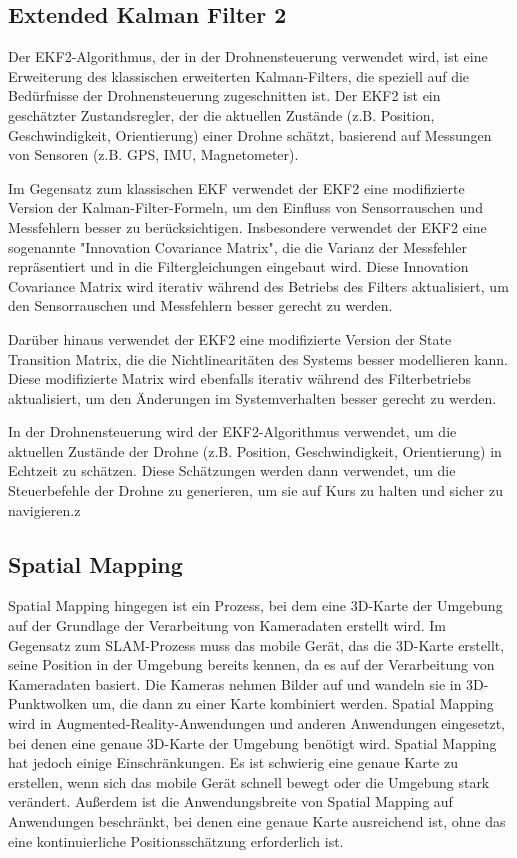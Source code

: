     \cite[vgl. ]{SWB-1841134112}

 \subsection{Extended Kalman Filter 2}
    Der \ac{EKF}2-Algorithmus, der in der Drohnensteuerung verwendet wird, ist eine Erweiterung des klassischen erweiterten Kalman-Filters, die speziell auf die Bedürfnisse der Drohnensteuerung zugeschnitten ist. Der EKF2 ist ein geschätzter Zustandsregler, der die aktuellen Zustände (z.B. Position, Geschwindigkeit, Orientierung) einer Drohne schätzt, basierend auf Messungen von Sensoren (z.B. \ac{GPS}, \ac{IMU}, Magnetometer).

Im Gegensatz zum klassischen EKF verwendet der EKF2 eine modifizierte Version der Kalman-Filter-Formeln, um den Einfluss von Sensorrauschen und Messfehlern besser zu berücksichtigen. Insbesondere verwendet der EKF2 eine sogenannte "Innovation Covariance Matrix", die die Varianz der Messfehler repräsentiert und in die Filtergleichungen eingebaut wird. Diese Innovation Covariance Matrix wird iterativ während des Betriebs des Filters aktualisiert, um den Sensorrauschen und Messfehlern besser gerecht zu werden.

Darüber hinaus verwendet der EKF2 eine modifizierte Version der State Transition Matrix, die die Nichtlinearitäten des Systems besser modellieren kann. Diese modifizierte Matrix wird ebenfalls iterativ während des Filterbetriebs aktualisiert, um den Änderungen im Systemverhalten besser gerecht zu werden.

In der Drohnensteuerung wird der EKF2-Algorithmus verwendet, um die aktuellen Zustände der Drohne (z.B. Position, Geschwindigkeit, Orientierung) in Echtzeit zu schätzen. Diese Schätzungen werden dann verwendet, um die Steuerbefehle der Drohne zu generieren, um sie auf Kurs zu halten und sicher zu navigieren.z
    
    \subsection{Spatial Mapping} \label{spatial_mapping:subsection}

    Spatial Mapping hingegen ist ein Prozess, bei dem eine 3D-Karte der Umgebung auf der Grundlage der Verarbeitung von Kameradaten erstellt wird. Im Gegensatz zum SLAM-Prozess muss das mobile Gerät, das die 3D-Karte erstellt, seine Position in der Umgebung bereits kennen, da es auf der Verarbeitung von Kameradaten basiert. Die Kameras nehmen Bilder auf und wandeln sie in 3D-Punktwolken um, die dann zu einer Karte kombiniert werden. Spatial Mapping wird in Augmented-Reality-Anwendungen und anderen Anwendungen eingesetzt, bei denen eine genaue 3D-Karte der Umgebung benötigt wird.
    Spatial Mapping hat jedoch einige Einschränkungen.
    Es ist schwierig eine genaue Karte zu erstellen, wenn sich das mobile Gerät schnell bewegt oder die Umgebung stark verändert. Außerdem ist die Anwendungsbreite von Spatial Mapping auf Anwendungen beschränkt, bei denen eine genaue Karte ausreichend ist, ohne das eine kontinuierliche Positionsschätzung erforderlich ist.
   

